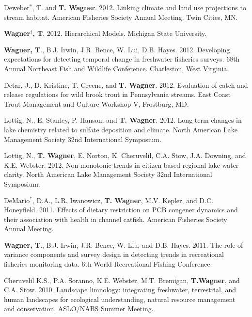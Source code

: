 \documentclass[10pt]{article}
\begin{document}
\begin{flushleft}
\begin{etaremune}
\item Deweber$^*$, T. and  {\bf T. Wagner}. 2012. Linking climate and land use projections to stream habitat. American Fisheries Society Annual Meeting. Twin Cities, MN. 

\item {\bf Wagner$^\ddagger$, T}. 2012. Hierarchical Models. Michigan State University.

 \item {\bf Wagner, T}., B.J. Irwin, J.R. Bence, W. Lui, D.B. Hayes. 2012. Developing expectations for detecting temporal change in freshwater fisheries surveys. 68th Annual Northeast Fish and Wildlife Conference. Charleston, West Virginia. 

\item Detar, J., D. Kristine, T. Greene, and {\bf T. Wagner}. 2012. Evaluation of catch and release regulations for wild brook trout in Pennsylvania streams. East Coast Trout Management and Culture Workshop V, Frostburg, MD.

\item Lottig, N., E. Stanley, P. Hanson, and {\bf T. Wagner}. 2012. Long-term changes in lake chemistry related to sulfate deposition and climate. North American Lake Management Society 32nd International Symposium.

\item Lottig, N., {\bf T. Wagner}, E. Norton, K. Cheruvelil, C.A. Stow, J.A. Downing, and K.E. Webster. 2012. Non-monotonic trends in citizen-based regional lake water clarity. North American Lake Management Society 32nd International Symposium.


\item DeMario$^*$, D.A., L.R. Iwanowicz, {\bf T. Wagner}, M.V. Kepler, and D.C. Honeyfield. 2011. Effects of dietary restriction on PCB congener dynamics and their association with health in channel catfish. American Fisheries Society Annual Meeting. 

\item {\bf Wagner, T}., B.J. Irwin, J.R. Bence, W. Liu, and D.B. Hayes. 2011. The role of variance components and survey design in detecting trends in recreational fisheries monitoring data. 6th World Recreational Fishing Conference. 

\item Cheruvelil K.S., P.A. Soranno, K.E. Webster, M.T. Bremigan, {\bf T.Wagner}, and C.A. Stow. 2010. Landscape limnology: integrating freshwater, terrestrial, and human landscapes for ecological understanding, natural resource management and conservation. ASLO/NABS Summer Meeting.


\end{etaremune}
\end{flushleft}
\end{document}
